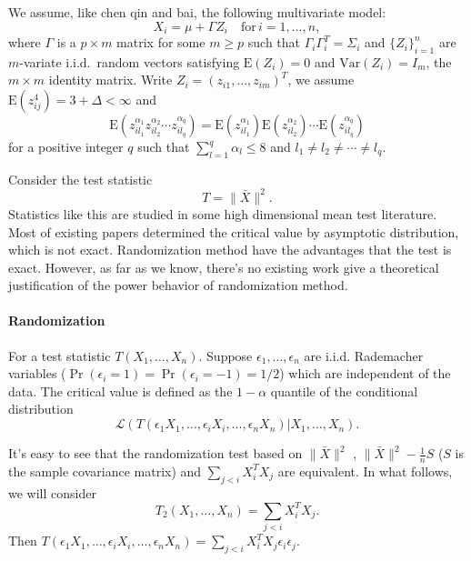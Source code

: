 \documentclass[review]{elsarticle}
\theoremstyle{plain}
\theoremstyle{definition}
\theoremstyle{remark}
\begin{document}
We assume, like chen qin and bai, the following multivariate model:
\begin{equation}
    X_i=\mu+\Gamma Z_i\quad \textrm{for}\, i=1,\ldots,n,
\end{equation}
where $\Gamma$ is a $p\times m$ matrix for some $m\geq p$ such that $\Gamma_i\Gamma_i^T=\Sigma_i$ and ${\{Z_{i}\}}_{i=1}^n$ are $m$-variate i.i.d.\ random vectors satisfying $\mathrm{E}(Z_i)=0$ and $\mathrm{Var}(Z_i)=I_m$, the $m\times m$ identity matrix. Write $Z_i={(z_{i1},\ldots,z_{im})}^T$, we assume $\mathrm{E}(z_{ij}^4)=3+\Delta<\infty$ and
\begin{equation}
    \mathrm{E}(z_{il_1}^{\alpha_1}z_{il_2}^{\alpha_2}\cdots z_{il_q}^{\alpha_q})=\mathrm{E}(z_{il_1}^{\alpha_1})\mathrm{E}(z_{il_2}^{\alpha_2})\cdots \mathrm{E}(z_{il_q}^{\alpha_q})
\end{equation}
for a positive integer $q$ such that $\sum_{l=1}^q \alpha_l\leq 8$ and $l_1\neq l_2\neq \cdots \neq l_q$.

Consider the test statistic 
\begin{equation}
    T=\|\bar{X}\|^2.
\end{equation}
Statistics like this are studied in some high dimensional mean test literature. Most of existing papers determined the critical value by asymptotic distribution, which is not exact. Randomization method have the advantages that the test is exact. However, as far as we know, there's no existing work give a theoretical justification of the power behavior of randomization method.

\paragraph{Randomization}
For a test statistic $T(X_1,\ldots, X_n)$. Suppose $\epsilon_1,\ldots,\epsilon_n$ are i.i.d. Rademacher variables ($\Pr(\epsilon_i=1)=\Pr(\epsilon_i=-1)=1/2$) which are independent of the data. The critical value is defined as the $1-\alpha$ quantile of the conditional distribution
\begin{equation}
    \mathcal{L}(T(\epsilon_1 X_1,\ldots,\epsilon_i X_i,\ldots,\epsilon_n X_n)|X_1,\ldots,X_n).
\end{equation}

It's easy to see that the randomization test based on $\|\bar{X}\|^2$ , 
$\|\bar{X}\|^2-\frac{1}{n}S$ ($S$ is the sample covariance matrix) and $\sum_{j<i}X_i^T X_j$ are equivalent.
In what follows, we will consider
\begin{equation}
    T_2(X_1,\ldots,X_n)=\sum_{j<i}X_i^TX_j.
\end{equation}
Then $T(\epsilon_1 X_1,\ldots,\epsilon_i X_i,\ldots,\epsilon_n X_n)=\sum_{j<i}X_i^T X_j \epsilon_i \epsilon_j$.
\end{document}
